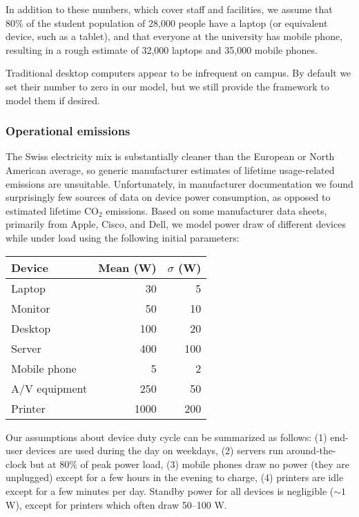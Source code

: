 \documentclass[11pt]{article}
\begin{document}
In addition to these numbers, which cover staff and facilities, we assume that 80\% of the student population of 28,000 people have a laptop (or equivalent device, such as a tablet), and that everyone at the university has mobile phone, resulting in a rough estimate of 32,000 laptops and 35,000 mobile phones.

Traditional desktop computers appear to be infrequent on campus. By default we set their number to zero in our model, but we still provide the framework to model them if desired.

\subsubsection*{Operational emissions}

The Swiss electricity mix is substantially cleaner than the European or North American average, so generic manufacturer estimates of lifetime usage-related emissions are unsuitable. Unfortunately, in manufacturer documentation we found surprisingly few sources of data on device power consumption, as opposed to estimated lifetime CO$_2$ emissions. Based on some manufacturer data sheets, primarily from Apple, Cisco, and Dell, we model power draw of different devices while under load using the following initial parameters:

\begin{center}
  \begin{tabular}{|l|r|r|}
    \hline
    \textbf{Device} & \textbf{Mean (W)} & \textbf{$\sigma$ (W)} \\ \hline
    Laptop & 30 & 5 \\ \hline
    Monitor & 50 & 10 \\ \hline
    Desktop & 100 & 20 \\ \hline
    Server & 400 & 100 \\ \hline
    Mobile phone & 5 & 2 \\ \hline
    A/V equipment & 250 & 50 \\ \hline
    Printer & 1000 & 200 \\ \hline
  \end{tabular}
\end{center}

Our assumptions about device duty cycle can be summarized as follows: (1) end-user devices are used during the day on weekdays, (2) servers run around-the-clock but at 80\% of peak power load, (3) mobile phones draw no power (they are unplugged) except for a few hours in the evening to charge, (4) printers are idle except for a few minutes per day. Standby power for all devices is negligible ($\sim 1$ W), except for printers which often draw 50--100 W.
\end{document}
